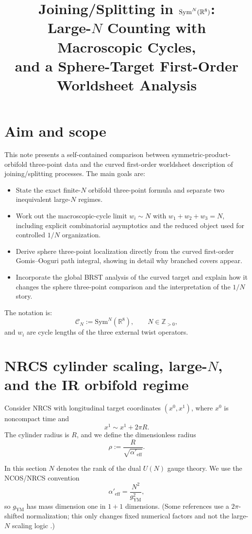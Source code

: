 \documentclass[11pt]{article}
\title{Joining/Splitting in \texorpdfstring{$\Sym^N(\bR^8)$}{SymN(R8)}:\\
Large-\texorpdfstring{$N$}{N} Counting with Macroscopic Cycles,\\
and a Sphere-Target First-Order Worldsheet Analysis}
\author{}
\date{}
\newcommand{\Sym}{\mathrm{Sym}}
\newcommand{\mc}[1]{\mathcal{#1}}
\newcommand{\bR}{\mathbb{R}}
\newcommand{\Aeff}{\alpha'_{\mathrm{eff}}}
\begin{document}
\maketitle

\section{Aim and scope}
This note presents a self-contained comparison between symmetric-product-orbifold three-point data and the curved first-order worldsheet description of joining/splitting processes. The main goals are:
\begin{itemize}
\item State the exact finite-$N$ orbifold three-point formula and separate two inequivalent large-$N$ regimes.
\item Work out the macroscopic-cycle limit $w_i\sim N$ with $w_1+w_2+w_3=N$, including explicit combinatorial asymptotics and the reduced object used for controlled $1/N$ organization.
\item Derive sphere three-point localization directly from the curved first-order Gomis--Ooguri path integral, showing in detail why branched covers appear.
\item Incorporate the global BRST analysis of the curved target and explain how it changes the sphere three-point comparison and the interpretation of the $1/N$ story.
\end{itemize}

The notation is:
\begin{equation}
\mc C_N:=\Sym^N(\bR^8),\qquad N\in \mathbb{Z}_{>0},
\end{equation}
and $w_i$ are cycle lengths of the three external twist operators.

\section{NRCS cylinder scaling, large-\texorpdfstring{$N$}{N}, and the IR orbifold regime}
\label{sec:nrcs-cylinder-ir}
Consider NRCS with longitudinal target coordinates $(x^0,x^1)$, where $x^0$ is noncompact time and
\begin{equation}
x^1\sim x^1+2\pi R.
\end{equation}
The cylinder radius is $R$, and we define the dimensionless radius
\begin{equation}
\rho:=\frac{R}{\sqrt{\Aeff}}.
\end{equation}

In this section $N$ denotes the rank of the dual $U(N)$ gauge theory. We use the NCOS/NRCS convention
\begin{equation}\label{eq:alphaeff-gym-n}
\Aeff=\frac{N^2}{g_{\mathrm{YM}}^2},
\end{equation}
so $g_{\mathrm{YM}}$ has mass dimension one in $1+1$ dimensions. (Some references use a $2\pi$-shifted normalization; this only changes fixed numerical factors and not the large-$N$ scaling logic \cite{klebanov200011dimensionalncosun}.)
\end{document}
